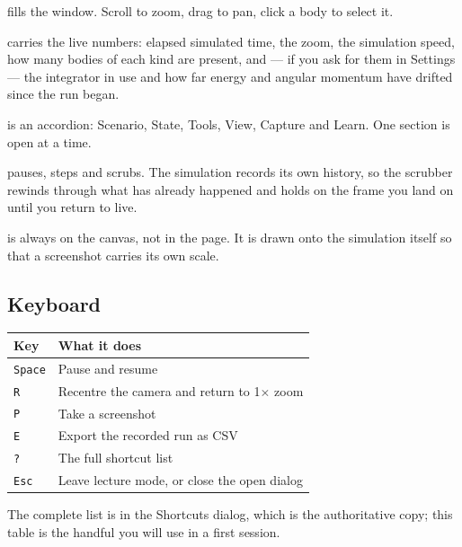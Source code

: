 \documentclass[11pt,a4paper]{article}
\newcommand{\ui}[1]{\textsf{#1}}
\newcommand{\key}[1]{\texttt{#1}}
\begin{document}
\begin{description}[style=nextline,leftmargin=1em]
  \item[The simulation] fills the window. Scroll to zoom, drag to pan, click a
  body to select it.
  \item[The readout, top left] carries the live numbers: elapsed simulated time,
  the zoom, the simulation speed, how many bodies of each kind are present, and
  --- if you ask for them in Settings --- the integrator in use and how far
  energy and angular momentum have drifted since the run began.
  \item[The control rail, right] is an accordion: \ui{Scenario}, \ui{State},
  \ui{Tools}, \ui{View}, \ui{Capture} and \ui{Learn}. One section is open at a
  time.
  \item[The transport bar, bottom] pauses, steps and scrubs. The simulation
  records its own history, so the scrubber rewinds through what has already
  happened and holds on the frame you land on until you return to live.
  \item[The scale bar, bottom left] is always on the canvas, not in the page. It
  is drawn onto the simulation itself so that a screenshot carries its own
  scale.
\end{description}

\subsection{Keyboard}

\begin{longtable}{@{}ll@{}}
\toprule
\textbf{Key} & \textbf{What it does} \\
\midrule
\endhead
\key{Space} & Pause and resume \\
\key{R} & Recentre the camera and return to 1$\times$ zoom \\
\key{P} & Take a screenshot \\
\key{E} & Export the recorded run as CSV \\
\key{?} & The full shortcut list \\
\key{Esc} & Leave lecture mode, or close the open dialog \\
\bottomrule
\end{longtable}

The complete list is in the \ui{Shortcuts} dialog, which is the authoritative
copy; this table is the handful you will use in a first session.

\end{document}
